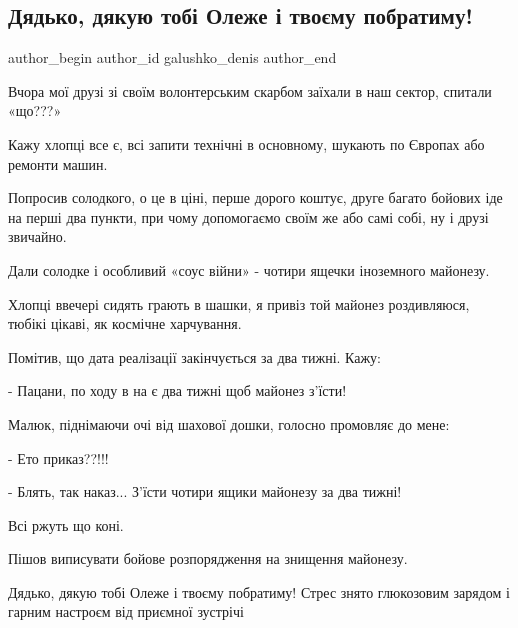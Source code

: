  
 
 
 
 

\subsection{Дядько, дякую тобі Олеже і твоєму побратиму!}
\label{sec:03_12_2022.fb.galushko_denis.1.dyadko__dyakuyu_tob_}

\ifcmt
 author_begin
   author_id galushko_denis
 author_end
\fi

Вчора мої друзі зі своїм волонтерським скарбом заїхали в наш сектор, спитали
«що???»     

Кажу хлопці все є, всі запити технічні в основному, шукають по Європах або
ремонти машин.

Попросив солодкого, о це в ціні, перше дорого коштує, друге багато бойових іде
на перші два пункти, при чому допомогаємо своїм же або самі собі, ну і друзі
звичайно.

Дали солодке і особливий «соус війни» - чотири ящечки іноземного майонезу.

Хлопці ввечері сидять грають в шашки, я привіз той майонез роздивляюся, тюбікі
цікаві, як космічне харчування. 

Помітив, що дата реалізації закінчується за два тижні. Кажу: 

- Пацани, по ходу в на є два тижні щоб майонез з'їсти!

Малюк, піднімаючи очі від шахової дошки, голосно промовляє до мене: 

- Ето приказ??!!!

- Блять, так наказ... З'їсти чотири ящики майонезу за два тижні!

Всі ржуть що коні.  

Пішов виписувати бойове розпорядження на знищення майонезу. 

Дядько, дякую тобі Олеже і твоєму побратиму! Стрес знято глюкозовим зарядом і
гарним настроєм від приємної зустрічі 🤝🇺🇦

